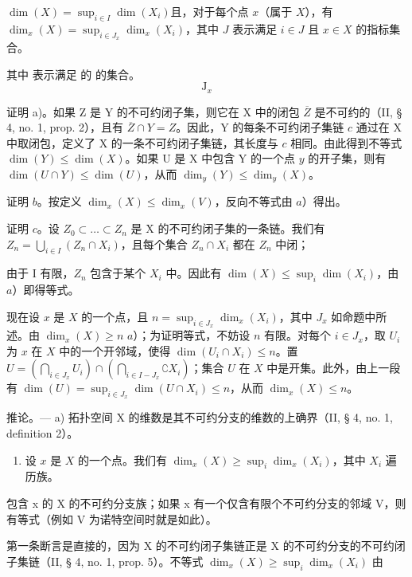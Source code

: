 \(\dim(X) = \sup_{i \in I} \dim(X_i)\)且，对于每个点 \(x\)（属于 \(X\)），有 \(\dim_x(X) = \sup_{i \in J_x} \dim_x(X_i)\)，其中 \(J\) 表示满足 \(i \in J\) 且 \(x \in X\) 的指标集合。

其中  表示满足  的  的集合。\[
\mathrm{J} _ {x}
\]

证明 a)。如果 Z 是 Y 的不可约闭子集，则它在 X 中的闭包 \(\overline{Z}\) 是不可约的（II, § 4, no. 1, prop. 2），且有 \(\overline{Z} \cap Y = Z\)。因此，Y 的每条不可约闭子集链 \(c\) 通过在 X 中取闭包，定义了 X 的一条不可约闭子集链，其长度与 \(c\) 相同。由此得到不等式 \(\dim(Y) \leqslant \dim(X)\)。如果 U 是 X 中包含 Y 的一个点 \(y\) 的开子集，则有 \(\dim(U \cap Y) \leqslant \dim(U)\)，从而 \(\dim_y(Y) \leqslant \dim_y(X)\)。

证明 \(b\)。按定义 \(\dim_{x}(X) \leqslant \dim_{x}(V)\)，反向不等式由 \(a\)）得出。

证明 \(c\)。设 \(Z_{0} \subset \ldots \subset Z_{n}\) 是 X 的不可约闭子集的一条链。我们有 \(Z_{n} = \bigcup_{i \in I} (Z_{n} \cap X_{i})\)，且每个集合 \(Z_{n} \cap X_{i}\) 都在 \(Z_{n}\) 中闭；

由于 I 有限，\(Z_{n}\) 包含于某个 \(X_{i}\) 中。因此有 \(\dim(X) \leqslant \sup_{i} \dim(X_{i})\)，由 \(a\)）即得等式。

现在设 \(x\) 是 \(X\) 的一个点，且 \(n = \sup_{i \in J_x} \dim_x(X_i)\)，其中 \(J_x\) 如命题中所述。由 \(\dim_x(X) \geqslant n\) \(a\)）；为证明等式，不妨设 \(n\) 有限。对每个 \(i \in J_x\)，取 \(U_i\) 为 \(x\) 在 \(X\) 中的一个开邻域，使得 \(\dim(U_i \cap X_i) \leqslant n\)。置 \(U = (\bigcap_{i \in J_x} U_i) \cap (\bigcap_{i \in I - J_x} \complement X_i)\)；集合 \(U\) 在 \(X\) 中是开集。此外，由上一段有 \(\dim(U) = \sup_{i \in J_x} \dim(U \cap X_i) \leqslant n\)，从而 \(\dim_x(X) \leqslant n\)。

推论。--- a) 拓扑空间 X 的维数是其不可约分支的维数的上确界（II, § 4, no. 1, definition 2）。

\begin{enumerate}
\def\labelenumi{\alph{enumi})}
\setcounter{enumi}{1}
\tightlist
\item
  设 \(x\) 是 \(X\) 的一个点。我们有 \(\dim_x(X) \geqslant \sup_i \dim_x(X_i)\)，其中 \(X_i\) 遍历族。
\end{enumerate}
包含 x 的 X 的不可约分支族；如果 x 有一个仅含有限个不可约分支的邻域 V，则有等式（例如 V 为诺特空间时就是如此）。


第一条断言是直接的，因为 X 的不可约闭子集链正是 X 的不可约分支的不可约闭子集链（II, § 4, no. 1, prop. 5）。不等式 \(\dim_x(X) \geqslant \sup_i \dim_x(X_i)\) 由

